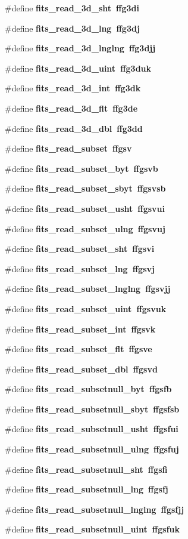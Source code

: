 \begin{CompactItemize}
\#define \bf{fits\_\-read\_\-3d\_\-sht}~ffg3di
\item 
\#define \bf{fits\_\-read\_\-3d\_\-lng}~ffg3dj
\item 
\#define \bf{fits\_\-read\_\-3d\_\-lnglng}~ffg3djj
\item 
\#define \bf{fits\_\-read\_\-3d\_\-uint}~ffg3duk
\item 
\#define \bf{fits\_\-read\_\-3d\_\-int}~ffg3dk
\item 
\#define \bf{fits\_\-read\_\-3d\_\-flt}~ffg3de
\item 
\#define \bf{fits\_\-read\_\-3d\_\-dbl}~ffg3dd
\item 
\#define \bf{fits\_\-read\_\-subset}~ffgsv
\item 
\#define \bf{fits\_\-read\_\-subset\_\-byt}~ffgsvb
\item 
\#define \bf{fits\_\-read\_\-subset\_\-sbyt}~ffgsvsb
\item 
\#define \bf{fits\_\-read\_\-subset\_\-usht}~ffgsvui
\item 
\#define \bf{fits\_\-read\_\-subset\_\-ulng}~ffgsvuj
\item 
\#define \bf{fits\_\-read\_\-subset\_\-sht}~ffgsvi
\item 
\#define \bf{fits\_\-read\_\-subset\_\-lng}~ffgsvj
\item 
\#define \bf{fits\_\-read\_\-subset\_\-lnglng}~ffgsvjj
\item 
\#define \bf{fits\_\-read\_\-subset\_\-uint}~ffgsvuk
\item 
\#define \bf{fits\_\-read\_\-subset\_\-int}~ffgsvk
\item 
\#define \bf{fits\_\-read\_\-subset\_\-flt}~ffgsve
\item 
\#define \bf{fits\_\-read\_\-subset\_\-dbl}~ffgsvd
\item 
\#define \bf{fits\_\-read\_\-subsetnull\_\-byt}~ffgsfb
\item 
\#define \bf{fits\_\-read\_\-subsetnull\_\-sbyt}~ffgsfsb
\item 
\#define \bf{fits\_\-read\_\-subsetnull\_\-usht}~ffgsfui
\item 
\#define \bf{fits\_\-read\_\-subsetnull\_\-ulng}~ffgsfuj
\item 
\#define \bf{fits\_\-read\_\-subsetnull\_\-sht}~ffgsfi
\item 
\#define \bf{fits\_\-read\_\-subsetnull\_\-lng}~ffgsfj
\item 
\#define \bf{fits\_\-read\_\-subsetnull\_\-lnglng}~ffgsfjj
\item 
\#define \bf{fits\_\-read\_\-subsetnull\_\-uint}~ffgsfuk

\end{CompactItemize}
